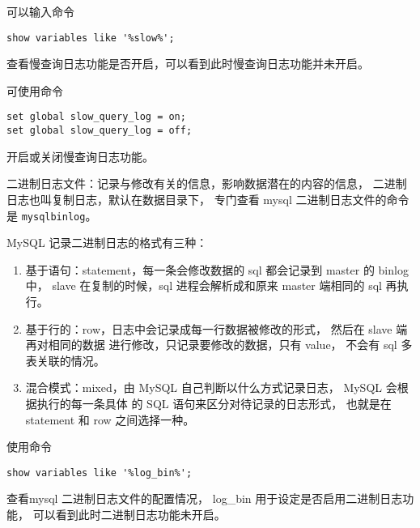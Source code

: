 可以输入命令
\begin{verbatim}
show variables like '%slow%';
\end{verbatim}
查看慢查询日志功能是否开启，可以看到此时慢查询日志功能并未开启。

可使用命令
\begin{verbatim}
set global slow_query_log = on;
set global slow_query_log = off;
\end{verbatim}
开启或关闭慢查询日志功能。

二进制日志文件：记录与修改有关的信息，影响数据潜在的内容的信息，
二进制日志也叫复制日志，默认在数据目录下，
专门查看 mysql 二进制日志文件的命令是 \texttt{mysqlbinlog}。

MySQL 记录二进制日志的格式有三种：
\begin{enumerate}
  \item 基于语句：statement，每一条会修改数据的 sql 都会记录到 master 的 binlog 中，
    slave 在复制的时候，sql 进程会解析成和原来 master 端相同的
    sql 再执行。
  \item 基于行的：row，日志中会记录成每一行数据被修改的形式，
    然后在 slave 端再对相同的数据
    进行修改，只记录要修改的数据，只有 value，
    不会有 sql 多表关联的情况。
  \item 混合模式：mixed，由 MySQL 自己判断以什么方式记录日志，
    MySQL 会根据执行的每一条具体
    的 SQL 语句来区分对待记录的日志形式，
    也就是在 statement 和 row 之间选择一种。
\end{enumerate}

使用命令
\begin{verbatim}
show variables like '%log_bin%';
\end{verbatim}
查看mysql 二进制日志文件的配置情况，
log\_bin 用于设定是否启用二进制日志功能，
可以看到此时二进制日志功能未开启。
